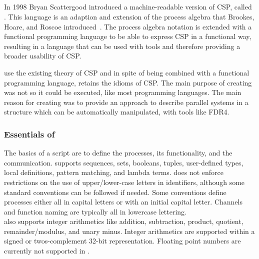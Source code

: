 \subsection{\cspm{}}
In 1998 Bryan Scattergood introduced a machine-readable version of CSP, called \cspm. This language is an adaption and extension of the process algebra that Brookes, Hoare, and Roscoe introduced~\cite{Brookes1984}. The process algebra notation is extended with a functional programming language to be able to express CSP in a functional way, resulting in a language that can be used with tools and therefore providing a broader usability of CSP.

\cspm{} use the existing theory of CSP and in spite of being combined with a functional programming language, \cspm{} retains the idioms of CSP.
The main purpose of creating \cspm{} was not so it could be executed, like most programming languages. The main reason for creating \cspm{} was to provide an approach to describe parallel systems in a structure which can be automatically manipulated, with tools like FDR4.

\subsubsection{Essentials of \cspm}
The basics of a \cspm{} script are to define the processes, its functionality, and the communication. \cspm{} supports sequences, sets, booleans, tuples, user-defined types, local definitions, pattern matching, and lambda terms.
\cspm{} does not enforce restrictions on the use of upper/lower-case letters in identifiers, although some standard conventions can be followed if needed. Some conventions define processes either all in capital letters or with an initial capital letter. Channels and function naming are typically all in lowercase lettering.\\

\cspm{} also supports integer arithmetics like addition, subtraction, product, quotient, remainder/modulus, and unary minus. Integer arithmetics are supported within a signed or twos-complement 32-bit representation.
Floating point numbers are currently not supported in \cspm. \\

